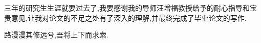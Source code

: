 
\begin{acknowledgements}

三年的研究生生涯就要过去了,我要感谢我的导师汪增福教授给予的耐心指导和宝贵意见,让我对论文的不足之处有了深入的理解,并最终完成了毕业论文的写作.


路漫漫其修远兮,吾将上下而求索.

\end{acknowledgements}
